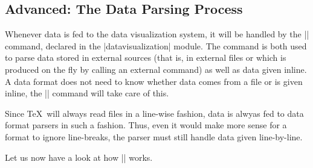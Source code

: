 \subsection{Advanced: The Data Parsing Process}

\label{section-dv-parsing}

Whenever data is fed to the data visualization system, it will be
handled by the |\pgfdata| command, declared in the |datavisualization|
module. The command is both used to parse data stored in external
sources (that is, in external files or which is produced on the fly by
calling an external command) as well as data given inline. A data
format does not need to know whether data comes from a file or is
given inline, the |\pgfdata| command will take care of this.

Since \TeX\ will always read files in a line-wise fashion, data is
alwyas fed to data format parsers in such a fashion. Thus, even it
would make more sense for a format to ignore line-breaks, the parser
must still handle data given line-by-line.

Let us now have a look at how |\pgfdata| works.

